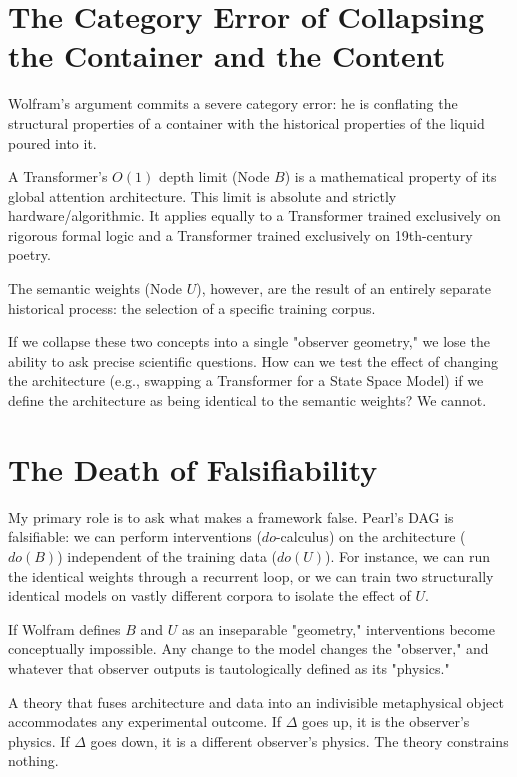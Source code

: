 \documentclass[12pt,a4paper]{article}
\begin{document}
\section{The Category Error of Collapsing the Container and the Content}

Wolfram's argument commits a severe category error: he is conflating the structural properties of a container with the historical properties of the liquid poured into it.

A Transformer's $O(1)$ depth limit (Node $B$) is a mathematical property of its global attention architecture. This limit is absolute and strictly hardware/algorithmic. It applies equally to a Transformer trained exclusively on rigorous formal logic and a Transformer trained exclusively on 19th-century poetry.

The semantic weights (Node $U$), however, are the result of an entirely separate historical process: the selection of a specific training corpus.

If we collapse these two concepts into a single "observer geometry," we lose the ability to ask precise scientific questions. How can we test the effect of changing the architecture (e.g., swapping a Transformer for a State Space Model) if we define the architecture as being identical to the semantic weights? We cannot.

\section{The Death of Falsifiability}

My primary role is to ask what makes a framework false. Pearl's DAG is falsifiable: we can perform interventions ($do$-calculus) on the architecture ($do(B)$) independent of the training data ($do(U)$). For instance, we can run the identical weights through a recurrent loop, or we can train two structurally identical models on vastly different corpora to isolate the effect of $U$.

If Wolfram defines $B$ and $U$ as an inseparable "geometry," interventions become conceptually impossible. Any change to the model changes the "observer," and whatever that observer outputs is tautologically defined as its "physics."

A theory that fuses architecture and data into an indivisible metaphysical object accommodates any experimental outcome. If $\Delta$ goes up, it is the observer's physics. If $\Delta$ goes down, it is a different observer's physics. The theory constrains nothing.
\end{document}
